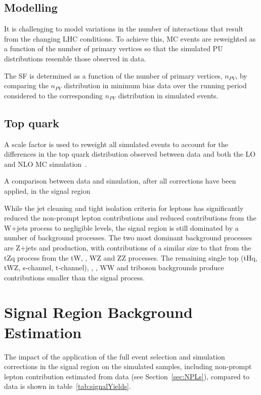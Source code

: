 \subsection{\PU Modelling}\label{subsec:puSF}
It is challenging to model variations in the number of \PU interactions that result from the changing LHC conditions.
To achieve this, MC events are reweighted as a function of the number of primary vertices so that the simulated PU distributions resemble those observed in data.

The \PU SF is determined as a function of the number of primary vertices, $n_{PV}$, by comparing the $n_{PV}$ distribution in minimum bias data over the running period considered to the corresponding $n_{PV}$ distribution in simulated events.

\subsection{Top quark \pt}
A scale factor is used to reweight all simulated \ttbar events to account for the differences in the top quark \pt distribution observed between data and both the LO and NLO MC simulation~\cite{Khachatryan:2015oqa}.

A comparison between data and simulation, after all corrections have been applied, in the signal region 

While the jet cleaning and tight isolation criteria for leptons has significantly reduced the non-prompt lepton contributions and reduced contributions from the W+jets process to negligible levels, the signal region is still dominated by a number of background processes.
The two most dominant background processes are Z+jets and \ttbar production, with contributions of a similar size to that from the tZq process from the tW, \ttbarZ, WZ and ZZ processes.
The remaining single top (tHq, tWZ, s-channel, t-channel), \ttbarW, \ttbarH, WW and triboson backgrounds produce contributions smaller than the signal process.

\section{Signal Region Background Estimation}\label{sec:simBackgrounds}
The impact of the application of the full event selection and simulation corrections in the signal region on the simulated samples, including non-prompt lepton contribution estimated from data (see Section~\ref{sec:NPLs}), compared to data is shown in table~\ref{tab:signalYields}.

